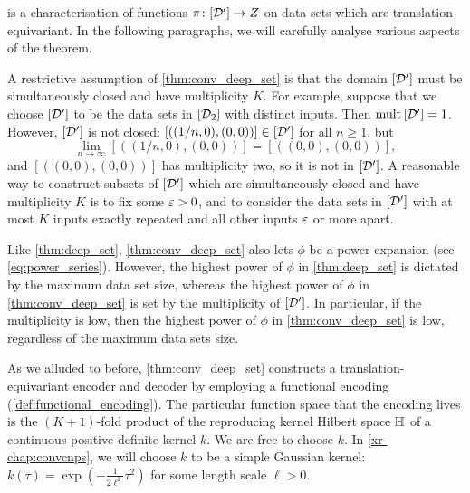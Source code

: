 \documentclass[12pt, twoside]{report}
\newcommand{\xrprefix}[1]{xr-#1}
\begin{document}
 is a characterisation of functions $\pi \colon [\mathcal{D}'] \to Z$ on data sets which are translation equivariant.
In the following paragraphs, we will carefully analyse various aspects of the theorem.

A restrictive assumption of \cref{thm:conv_deep_set} is that the domain $[\mathcal{D}']$ must be simultaneously closed and have multiplicity $K$.
For example, suppose that we choose $[\mathcal{D}']$ to be the data sets in $[\mathcal{D}_2]$ with distinct inputs.
Then $\operatorname{mult}\,[\mathcal{D}']=1$.
However, $[\mathcal{D}']$ is not closed: $[((1/n, 0), (0, 0))] \in [\mathcal{D}']$ for all $n \ge 1$, but
\begin{equation}
    \lim_{n \to \infty}[((1/n, 0), (0, 0))] = [((0, 0), (0, 0))],
\end{equation}
and $[((0, 0), (0, 0))]$ has multiplicity two, so it is not in $[\mathcal{D}']$.
A reasonable way to construct subsets of $[\mathcal{D}']$ which are simultaneously closed and have multiplicity $K$ is to fix some $\varepsilon > 0$, and to consider the data sets in $[\mathcal{D}']$ with at most $K$ inputs exactly repeated and all other inputs $\varepsilon$ or more apart.

Like \cref{thm:deep_set}, \cref{thm:conv_deep_set} also lets $\phi$ be a power expansion (see \eqref{eq:power_series}).
However, the highest power of $\phi$ in \cref{thm:deep_set} is dictated by the maximum data set size, whereas the highest power of $\phi$ in \cref{thm:conv_deep_set} is set by the multiplicity of $[\mathcal{D}']$.
In particular, if the multiplicity is low, then the highest power of $\phi$ in \cref{thm:conv_deep_set} is low, regardless of the maximum data sets size.

As we alluded to before, \cref{thm:conv_deep_set} constructs a translation-equivariant encoder and decoder by employing a functional encoding (\cref{def:functional_encoding}).
The particular function space that the encoding lives is the $(K+1)$-fold product of the reproducing kernel Hilbert space $\mathbb{H}$ of a continuous positive-definite kernel $k$.
We are free to choose $k$.
In \cref{\xrprefix{chap:convcnps}}, we will choose $k$ to be a simple Gaussian kernel: 
$k(\tau) = \exp(-\frac{1}{2\ell^2}\tau^2)$ for some length scale $\ell > 0$.
\end{document}
